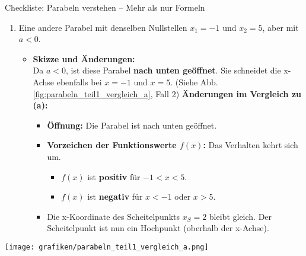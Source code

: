 \begin{loesungsumgebung}{Checkliste: Parabeln verstehen – Mehr als nur Formeln}
\begin{enumerate}[label=\textbf{Teil \arabic*:}]
\begin{enumerate}[label=(\alph*)]
        \item Eine andere Parabel mit denselben Nullstellen $x_1 = -1$ und $x_2 = 5$, aber mit $a < 0$.
        \begin{itemize}
            \item \textbf{Skizze und Änderungen:} \\
            Da $a < 0$, ist diese Parabel \textbf{nach unten geöffnet}. Sie schneidet die x-Achse ebenfalls bei $x=-1$ und $x=5$. (Siehe Abb. \ref{fig:parabeln_teil1_vergleich_a}, Fall 2)
            \textbf{Änderungen im Vergleich zu (a):}
            \begin{itemize}
                \item \textbf{Öffnung:} Die Parabel ist nach unten geöffnet.
                \item \textbf{Vorzeichen der Funktionswerte $f(x)$:} Das Verhalten kehrt sich um.
                    \begin{itemize}
                        \item $f(x)$ ist \textbf{positiv} für $-1 < x < 5$.
                        \item $f(x)$ ist \textbf{negativ} für $x < -1$ oder $x > 5$.
                    \end{itemize}
                \item Die x-Koordinate des Scheitelpunkts $x_S=2$ bleibt gleich. Der Scheitelpunkt ist nun ein Hochpunkt (oberhalb der x-Achse).
            \end{itemize}
        \end{itemize}
    \end{enumerate}
    \begin{center}
    \texttt{[image: grafiken/parabeln\_teil1\_vergleich\_a.png]}
    \label{fig:parabeln_teil1_vergleich_a}
    \end{center}


\end{enumerate}
\end{loesungsumgebung}
